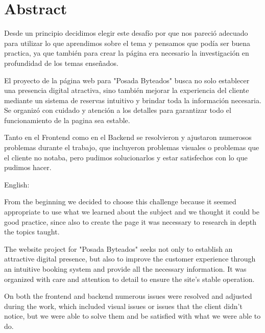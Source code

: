 \section{Abstract}


Desde un principio decidimos elegir este desafío por que nos pareció adecuado para utilizar lo que aprendimos sobre el tema y pensamos que podía ser buena practica, ya que también para crear la página era necesario la investigación en profundidad de los temas enseñados.


El proyecto de la página web para "Posada Byteados" busca no solo establecer una presencia digital atractiva, sino también mejorar la experiencia del cliente mediante un sistema de reservas intuitivo y brindar toda la información necesaria. Se organizó con cuidado y atención a los detalles para garantizar todo el funcionamiento de la pagina sea estable.


Tanto en el Frontend como en el Backend se resolvieron y ajustaron numerosos problemas durante el trabajo, que incluyeron problemas visuales o problemas que el cliente no notaba, pero pudimos solucionarlos y estar satisfechos con lo que pudimos hacer.

\hspace{5cm}

English:


From the beginning we decided to choose this challenge because it seemed appropriate to use what we learned about the subject and we thought it could be good practice, since also to create the page it was necessary to research in depth the topics taught.

The website project for "Posada Byteados" seeks not only to establish an attractive digital presence, but also to improve the customer experience through an intuitive booking system and provide all the necessary information. It was organized with care and attention to detail to ensure the site's stable operation.

On both the frontend and backend numerous issues were resolved and adjusted during the work, which included visual issues or issues that the client didn't notice, but we were able to solve them and be satisfied with what we were able to do.
